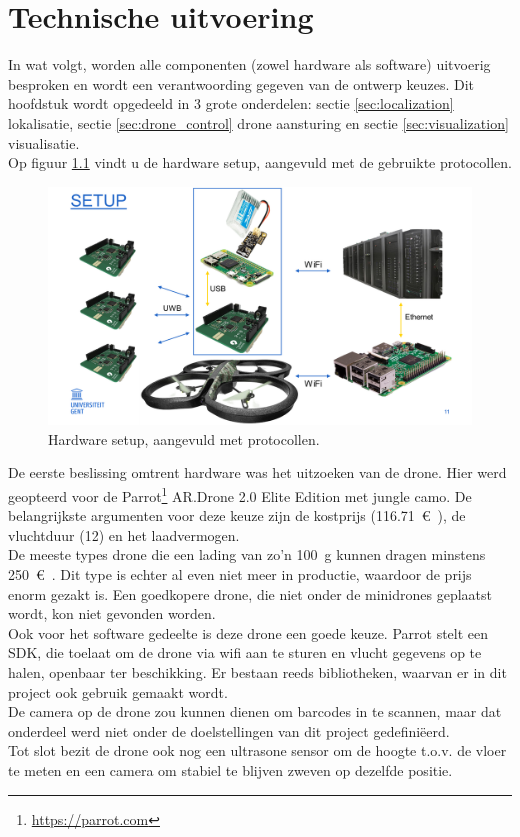 \chapter{Technische uitvoering}
In wat volgt, worden alle componenten (zowel hardware als software) uitvoerig besproken en wordt een verantwoording gegeven van de ontwerp keuzes.
Dit hoofdstuk wordt opgedeeld in 3 grote onderdelen: sectie \ref{sec:localization} lokalisatie, sectie \ref{sec:drone_control} drone aansturing en sectie \ref{sec:visualization} visualisatie.\\

Op figuur \ref{fig:setup} vindt u de hardware setup, aangevuld met de gebruikte protocollen.\\
\begin{figure}[p]
	\centering
	\includegraphics[width=\textwidth]{Setup}
	\caption[Setup]{Hardware setup, aangevuld met protocollen.}
	\label{fig:setup}
\end{figure}

De eerste beslissing omtrent hardware was het uitzoeken van de drone.
Hier werd geopteerd voor de Parrot\footnote{\url{https://parrot.com}} AR.Drone 2.0 Elite Edition met jungle camo.
De belangrijkste argumenten voor deze keuze zijn de kostprijs (\SI{116.71}{\euro{}}), de vluchtduur (\SI{12}{\min}) en het laadvermogen.\\
De meeste types drone die een lading van zo'n \SI{100}{\g} kunnen dragen minstens \SI{250}{\euro{}}.
Dit type is echter al even niet meer in productie, waardoor de prijs enorm gezakt is.
Een goedkopere drone, die niet onder de minidrones geplaatst wordt, kon niet gevonden worden.\\
Ook voor het software gedeelte is deze drone een goede keuze. Parrot stelt een SDK, die toelaat om de drone via wifi aan te sturen en vlucht gegevens op te halen, openbaar ter beschikking.
Er bestaan reeds bibliotheken, waarvan er in dit project ook gebruik gemaakt wordt.\\
De camera op de drone zou kunnen dienen om barcodes in te scannen, maar dat onderdeel werd niet onder de doelstellingen van dit project gedefini\"eerd.\\
Tot slot bezit de drone ook nog een ultrasone sensor om de hoogte t.o.v. de vloer te meten en een camera om stabiel te blijven zweven op dezelfde positie.\\

